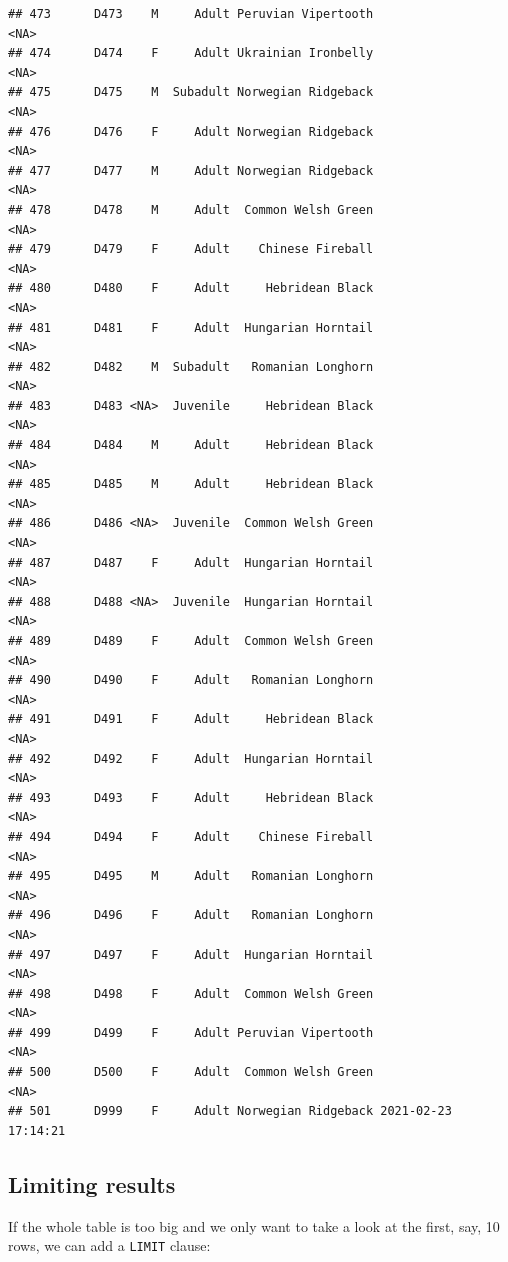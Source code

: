 \documentclass[
]{book}
\begin{document}
\begin{verbatim}
## 473      D473    M     Adult Peruvian Vipertooth                <NA>
## 474      D474    F     Adult Ukrainian Ironbelly                <NA>
## 475      D475    M  Subadult Norwegian Ridgeback                <NA>
## 476      D476    F     Adult Norwegian Ridgeback                <NA>
## 477      D477    M     Adult Norwegian Ridgeback                <NA>
## 478      D478    M     Adult  Common Welsh Green                <NA>
## 479      D479    F     Adult    Chinese Fireball                <NA>
## 480      D480    F     Adult     Hebridean Black                <NA>
## 481      D481    F     Adult  Hungarian Horntail                <NA>
## 482      D482    M  Subadult   Romanian Longhorn                <NA>
## 483      D483 <NA>  Juvenile     Hebridean Black                <NA>
## 484      D484    M     Adult     Hebridean Black                <NA>
## 485      D485    M     Adult     Hebridean Black                <NA>
## 486      D486 <NA>  Juvenile  Common Welsh Green                <NA>
## 487      D487    F     Adult  Hungarian Horntail                <NA>
## 488      D488 <NA>  Juvenile  Hungarian Horntail                <NA>
## 489      D489    F     Adult  Common Welsh Green                <NA>
## 490      D490    F     Adult   Romanian Longhorn                <NA>
## 491      D491    F     Adult     Hebridean Black                <NA>
## 492      D492    F     Adult  Hungarian Horntail                <NA>
## 493      D493    F     Adult     Hebridean Black                <NA>
## 494      D494    F     Adult    Chinese Fireball                <NA>
## 495      D495    M     Adult   Romanian Longhorn                <NA>
## 496      D496    F     Adult   Romanian Longhorn                <NA>
## 497      D497    F     Adult  Hungarian Horntail                <NA>
## 498      D498    F     Adult  Common Welsh Green                <NA>
## 499      D499    F     Adult Peruvian Vipertooth                <NA>
## 500      D500    F     Adult  Common Welsh Green                <NA>
## 501      D999    F     Adult Norwegian Ridgeback 2021-02-23 17:14:21
\end{verbatim}

\hypertarget{limiting-results}{%
\subsection{Limiting results}\label{limiting-results}}

If the whole table is too big and we only want to take a look at the first, say,
10 rows, we can add a \texttt{LIMIT} clause:
\end{document}
